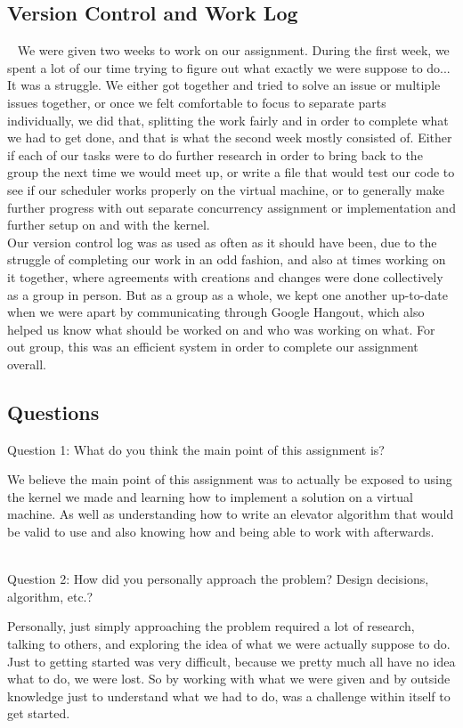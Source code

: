 \documentclass[10pt,journal,onecolumn,compsoc]{IEEEtran}
\begin{document}
\subsection{\textbf{Version Control and Work Log}} ~
We were given two weeks to work on our assignment. During the first week, we spent a lot of our time trying to figure out what exactly we were suppose to do... It was a struggle. We either got together and tried to solve an issue or multiple issues together, or once we felt comfortable to focus to separate parts individually, we did that, splitting the work fairly and in order to complete what we had to get done, and that is what the second week mostly consisted of. Either if each of our tasks were to do further research in order to bring back to the group the next time we would meet up, or write a file that would test our code to see if our scheduler works properly on the virtual machine, or to generally make further progress with out separate concurrency assignment or implementation and further setup on and with the kernel. \\

Our version control log was as used as often as it should have been, due to the struggle of completing our work in an odd fashion, and also at times working on it together, where agreements with creations and changes were done collectively as a group in person. But as a group as a whole, we kept one another up-to-date when we were apart by communicating through Google Hangout, which also helped us know what should be worked on and who was working on what. For out group, this was an efficient system in order to complete our assignment overall.

\subsection{\textbf{Questions}}

\noindent Question 1: What do you think the main point of this assignment is?\par
We believe the main point of this assignment was to actually be exposed to using the kernel we made and learning how to implement a solution on a virtual machine. As well as understanding how to write an elevator algorithm that would be valid to use and also knowing how and being able to work with afterwards.\\ ~ \par

\noindent Question 2: How did you personally approach the problem? Design decisions, algorithm, etc.?\par
Personally, just simply approaching the problem required a lot of research, talking to others, and exploring the idea of what we were actually suppose to do. Just to getting started was very difficult, because we pretty much all have no idea what to do, we were lost. So by working with what we were given and by outside knowledge just to understand what we had to do, was a challenge within itself to get started.
\end{document}
